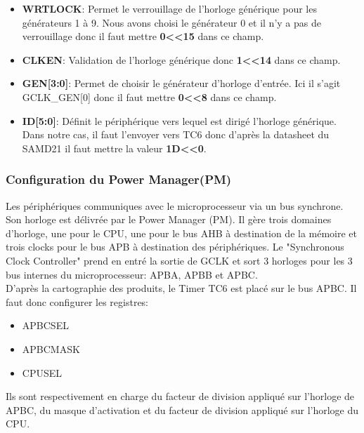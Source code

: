 \documentclass[a4paper]{article}
\begin{document}
	\begin{itemize}
		\item {\bf WRTLOCK}: Permet le verrouillage de l’horloge générique pour les générateurs 1 à 9. Nous avons choisi le générateur 0 et il n’y a pas de verrouillage donc il faut mettre {\bf 0\textless\textless15} dans ce champ.~~\\
		\item {\bf CLKEN}: Validation de l’horloge générique donc {\bf 1\textless\textless14} dans ce champ.~~\\
		\item {\bf GEN[3:0]}: Permet de choisir le générateur d’horloge d’entrée. Ici il s’agit GCLK\_GEN[0] donc il faut mettre {\bf 0\textless\textless8} dans ce champ.~~\\
		\item {\bf ID[5:0]}: Définit le périphérique vers lequel est dirigé l’horloge générique. Dans notre cas, il faut l’envoyer vers TC6 donc d’après la datasheet du SAMD21 il faut mettre la valeur {\bf 1D\textless\textless0}.~~\\
	\end{itemize}
	
	\subsubsection{Configuration du Power Manager(PM)} 
	Les périphériques communiques avec le microprocesseur via un bus synchrone. Son horloge est délivrée par le Power Manager (PM).
	Il gère trois domaines d'horloge, une pour le CPU, une pour le bus AHB à destination de la mémoire et trois clocks pour le bus APB à destination des périphériques.
	Le "Synchronous Clock Controller" prend en entré la sortie de GCLK et sort 3 horloges pour les 3 bus internes du microprocesseur: APBA, APBB et APBC.\\
	D'après la cartographie des produits, le Timer TC6 est placé sur le bus APBC. Il faut donc configurer les registres:
	\begin{itemize}
		\item {APBCSEL}
		\item {APBCMASK}
		\item {CPUSEL}
	\end{itemize}
Ils sont respectivement en charge du facteur de division appliqué sur l'horloge de APBC, du masque d'activation et du facteur de division appliqué sur l'horloge du CPU.
	\newpage
\end{document}
